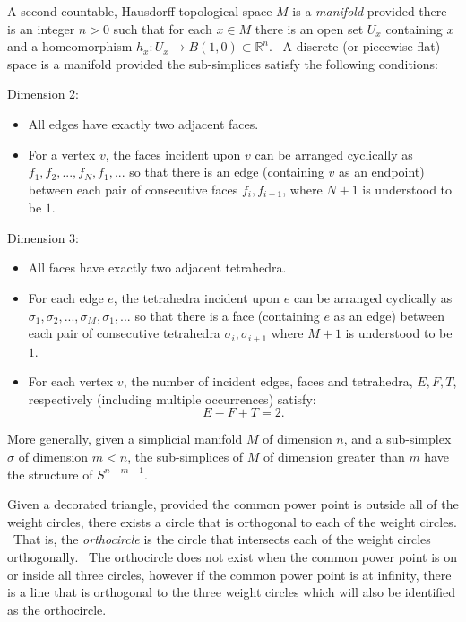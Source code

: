 \begin{description}
\item[manifold] A second countable, Hausdorff topological space $M$ is a 
\textit{manifold} provided there is an integer $n>0$ such that for each $%
x\in M$ there is an open set $U_{x}$ containing $x$ and a homeomorphism $%
h_{x}:U_{x}\rightarrow B\left( 1,0\right) \subset 
\mathbb{R}
^{n}$. \ A discrete (or piecewise flat) space is a manifold provided the
sub-simplices satisfy the following conditions:

\item Dimension 2:

\begin{itemize}
\item All edges have exactly two adjacent faces.

\item For a vertex $v$, the faces incident upon $v$ can be arranged
cyclically as $f_{1},f_{2},...,f_{N},f_{1},...$ so that there is an edge
(containing $v$ as an endpoint) between each pair of consecutive faces $%
f_{i},f_{i+1}$, where $N+1$ is understood to be $1$. \ 
\end{itemize}

\item Dimension 3:

\begin{itemize}
\item All faces have exactly two adjacent tetrahedra.

\item For each edge $e$, the tetrahedra incident upon $e$ can be arranged
cyclically as $\sigma _{1},\sigma _{2},...,\sigma _{M},\sigma _{1},...$ so
that there is a face (containing $e$ as an edge) between each pair of
consecutive tetrahedra $\sigma _{i},\sigma _{i+1}$ where $M+1$ is understood
to be $1$. \ 

\item For each vertex $v$, the number of incident edges, faces and
tetrahedra, $E,F,T$, respectively (including multiple occurrences) satisfy:%
\[
E-F+T=2. 
\]
\end{itemize}

\item More generally, given a simplicial manifold $M$ of dimension $n$, and
a sub-simplex $\sigma $ of dimension $m<n$, the sub-simplices of $M$ of
dimension greater than $m$ have the structure of $S^{n-m-1}$.

\item[orthocircle] Given a decorated triangle, provided the common power
point is outside all of the weight circles, there exists a circle that is
orthogonal to each of the weight circles. \ That is, the \textit{orthocircle}
is the circle that intersects each of the weight circles orthogonally. \ The
orthocircle does not exist when the common power point is on or inside all
three circles, however if the common power point is at infinity, there is a
line that is orthogonal to the three weight circles which will also be
identified as the orthocircle.


\end{description}
